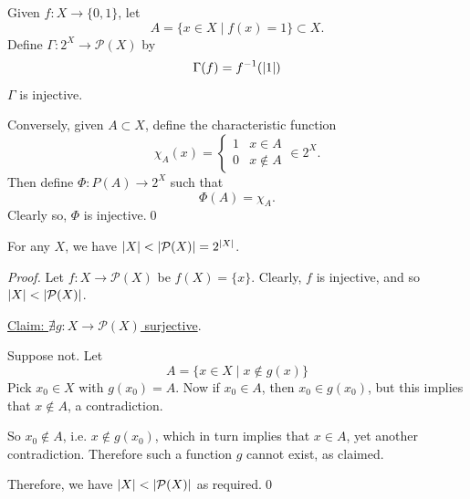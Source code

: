 \documentclass[notoc,notitlepage]{tufte-book}
\begin{document}
\begin{solution}
  Given $f : X \to \{ 0, 1 \}$, let
  \begin{equation*}
    A = \{ x \in X \mid f(x) = 1 \} \subset X.
  \end{equation*}
  Define $\Gamma : 2^X \to \mathcal{P}(X)$ by
  \begin{equation*}
    \Gamma(f) = f^{-1}(\left|1\right|)
  \end{equation*}
  $\Gamma$ is injective.

  Conversely, given $A \subset X$, define the characteristic function
  \begin{equation*}
    \chi_A(x) = \begin{cases}
      1 & x \in A \\
      0 & x \notin A
    \end{cases} \in 2^X.
  \end{equation*}
  Then define $\Phi : P(A) \to 2^X$ such that
  \begin{equation*}
    \Phi(A) = \chi_A.
  \end{equation*}
  Clearly so, $\Phi$ is injective.\qed
\end{solution}

\begin{thm}\label{thm:russell_s_paradox}
  For any $X$, we have $\left|X\right| < \left|\mathcal{P}(X)\right| = 2^{\left|X\right|}$.
\end{thm}

\begin{proof}
  Let $f : X \to \mathcal{P}(X)$ be $f(X) = \{ x \}$. Clearly, $f$ is injective, and so $\left|X\right| < \left|\mathcal{P}(X)\right|$.

  \noindent\underline{Claim: $\nexists g : X \to \mathcal{P}(X)$ surjective}.

  Suppose not. Let
  \begin{equation*}
     A = \{ x \in X \mid x \notin g(x) \}
  \end{equation*}
  Pick $x_0 \in X$ with $g(x_0) = A$. Now if $x_0 \in A$, then $x_0 \in g(x_0)$, but this implies that $x \notin A$, a contradiction.

  So $x_0 \notin A$, i.e. $x \notin g(x_0)$, which in turn implies that $x \in A$, yet another contradiction. Therefore such a function $g$ cannot exist, as claimed.

  Therefore, we have $\left|X\right| < \left|\mathcal{P}(X)\right|$ as required.\qed
\end{proof}
\end{document}

